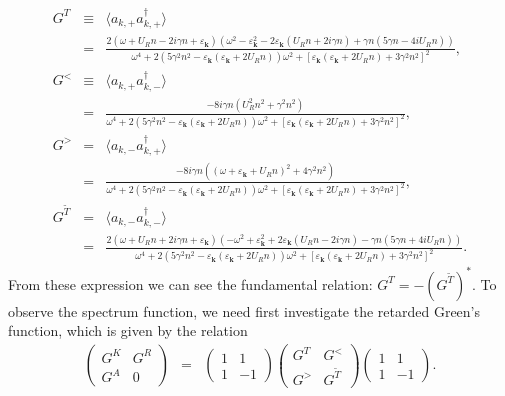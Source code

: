 \documentclass[aps,onecolumn,superscriptaddress,notitlepage,longbibliography]{revtex4-1}
\newcommand{\tmmathbf}[1]{\ensuremath{\boldsymbol{#1}}}
\begin{document}
\begin{eqnarray}
  G^T & \equiv & \langle a_{k, +} a^{\dagger}_{k, +} \rangle \nonumber\\
  & = & \frac{2 (\omega + U_R n - 2 i \gamma n + \varepsilon_{\tmmathbf{k}})
  (\omega^2 - \varepsilon_{\tmmathbf{k}}^2 - 2 \varepsilon_{\tmmathbf{k}} (U_R
  n + 2 i \gamma n) + \gamma n (5 \gamma n - 4 i U_R n))}{\omega^4 + 2 (5
  \gamma^2 n^2 - \varepsilon_{\tmmathbf{k}} (\varepsilon_{\tmmathbf{k}} + 2
  U_R n)) \omega^2 + [\varepsilon_{\tmmathbf{k}} (\varepsilon_{\tmmathbf{k}} +
  2 U_R n) + 3 \gamma^2 n^2]^2}, \\
  G^{<} & \equiv & \langle a_{k, +} a^{\dagger}_{k, -} \rangle \nonumber\\
  & = & \frac{- 8 i \gamma n (U_R^2 n^2 + \gamma^2 n^2)}{\omega^4 + 2 (5
  \gamma^2 n^2 - \varepsilon_{\tmmathbf{k}} (\varepsilon_{\tmmathbf{k}} + 2
  U_R n)) \omega^2 + [\varepsilon_{\tmmathbf{k}} (\varepsilon_{\tmmathbf{k}} +
  2 U_R n) + 3 \gamma^2 n^2]^2}, \\
  G^{>} & = & \langle a_{k, -} a_{k, +}^{\dagger} \rangle \nonumber\\
  & = & \frac{- 8 i \gamma n ((\omega + \varepsilon_{\tmmathbf{k}} + U_R n)^2
  + 4 \gamma^2 n^2)}{\omega^4 + 2 (5 \gamma^2 n^2 - \varepsilon_{\tmmathbf{k}}
  (\varepsilon_{\tmmathbf{k}} + 2 U_R n)) \omega^2 +
  [\varepsilon_{\tmmathbf{k}} (\varepsilon_{\tmmathbf{k}} + 2 U_R n) + 3
  \gamma^2 n^2]^2}, \\
  G^{\tilde{T}} & = & \langle a_{k, -} a_{k, -}^{\dagger} \rangle \nonumber\\
  & = & \frac{2 (\omega + U_R n + 2 i \gamma n + \varepsilon_{\tmmathbf{k}})
  (- \omega^2 + \varepsilon_{\tmmathbf{k}}^2 + 2 \varepsilon_{\tmmathbf{k}}
  (U_R n - 2 i \gamma n) - \gamma n (5 \gamma n + 4 i U_R n))}{\omega^4 + 2 (5
  \gamma^2 n^2 - \varepsilon_{\tmmathbf{k}} (\varepsilon_{\tmmathbf{k}} + 2
  U_R n)) \omega^2 + [\varepsilon_{\tmmathbf{k}} (\varepsilon_{\tmmathbf{k}} +
  2 U_R n) + 3 \gamma^2 n^2]^2} . 
\end{eqnarray}
From these expression we can see the fundamental relation: $G^T = -
(G^{\tilde{T}})^{\ast}$. To observe the spectrum function, we need first
investigate the retarded Green's function, which is given by the relation
\begin{eqnarray}
  \left(\begin{array}{cc}
    G^K & G^R\\
    G^A & 0
  \end{array}\right) & = & \left(\begin{array}{cc}
    1 & 1\\
    1 & - 1
  \end{array}\right) \left(\begin{array}{cc}
    G^T & G^{<}\\
    G^{>} & G^{\tilde{T}}
  \end{array}\right) \left(\begin{array}{cc}
    1 & 1\\
    1 & - 1
  \end{array}\right) . 
\end{eqnarray}
\end{document}
